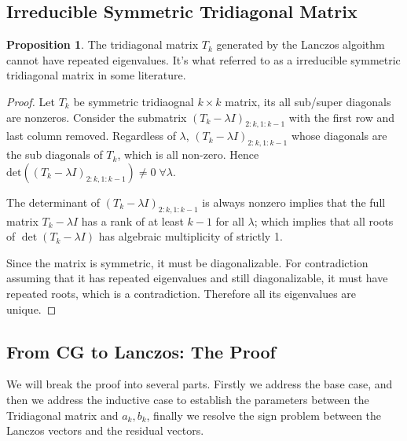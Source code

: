 \documentclass[]{article}
\theoremstyle{definition}
\newtheorem{prop}{Proposition}[section]  %
\begin{document}
\begin{appendices}
        \subsection{Irreducible Symmetric Tridiagonal Matrix}
            \begin{prop}\label{prop:Irreducible Symmetric Tridiagonal Matrix}
                The tridiagonal matrix $T_k$ generated by the Lanczos algoithm cannot have repeated eigenvalues. It's what referred to as a irreducible symmetric tridiagonal matrix in some literature. 
            \end{prop}
            \begin{proof}
                Let $T_k$ be symmetric tridiaognal $k\times k$ matrix, its all sub/super diagonals are nonzeros. Consider the submatrix $(T_k - \lambda I)_{2:k, 1:k-1}$ with the first row and last column removed. Regardless of $\lambda$, $(T_k - \lambda I)_{2:k, 1:k-1}$ whose diagonals are the sub diagonals of $T_k$, which is all non-zero. Hence $\text{det}((T_k - \lambda I)_{2:k, 1:k-1})\neq 0 \;\forall \lambda$. 
                \par
                The determinant of $(T_k - \lambda I)_{2:k, 1:k-1}$ is always nonzero implies that the full matrix $T_k - \lambda I$ has a rank of at least $k - 1$ for all $\lambda$; which implies that all roots of $\det(T_k - \lambda I)$ has algebraic multiplicity of strictly 1.
                \par
                Since the matrix is symmetric, it must be diagonalizable. For contradiction assuming that it has repeated eigenvalues and still diagonalizable, it must have repeated roots, which is a contradiction. Therefore all its eigenvalues are unique. 
            \end{proof}
        \subsection{From CG to Lanczos: The Proof}\label{sec:From_CG_to_Lanczos:The_Proof}
            We will break the proof into several parts. Firstly we address the base case, and then we address the inductive case to establish the parameters between the Tridiagonal matrix and $a_k, b_k$, finally we resolve the sign problem between the Lanczos vectors and the residual vectors. 

\end{appendices}
\end{document}
